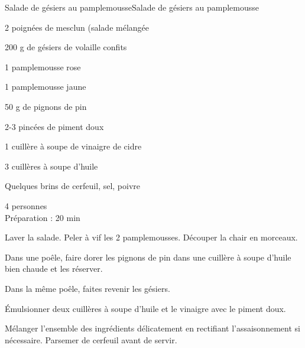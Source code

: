 \begin{recette}{Salade de gésiers au pamplemousse}{Salade de gésiers au pamplemousse}

\begin{ingredients}
2 poignées de mesclun (salade mélangée\par
200 g de gésiers de volaille confits\par
1 pamplemousse rose\par
1 pamplemousse jaune\par
50 g de pignons de pin\par
2-3 pincées de piment doux\par
1 cuillère à soupe de vinaigre de cidre\par
3 cuillères à soupe d'huile\par
Quelques brins de cerfeuil, sel, poivre\par
\end{ingredients}

\begin{infos}
4 personnes\\
Préparation : 20 min\\
\end{infos}

\begin{etapes}
\item Laver la salade. Peler à vif les 2 pamplemousses. Découper la chair en morceaux.
\item Dans une poêle, faire dorer les pignons de pin dans une cuillère à soupe d'huile bien chaude et les réserver.
\item Dans la même poêle, faites revenir les gésiers.
\item Émulsionner deux cuillères à soupe d'huile et le vinaigre avec le piment doux.
\item Mélanger l'ensemble des ingrédients délicatement en rectifiant l'assaisonnement si nécessaire. Parsemer de cerfeuil avant de servir.
\end{etapes}

\end{recette}